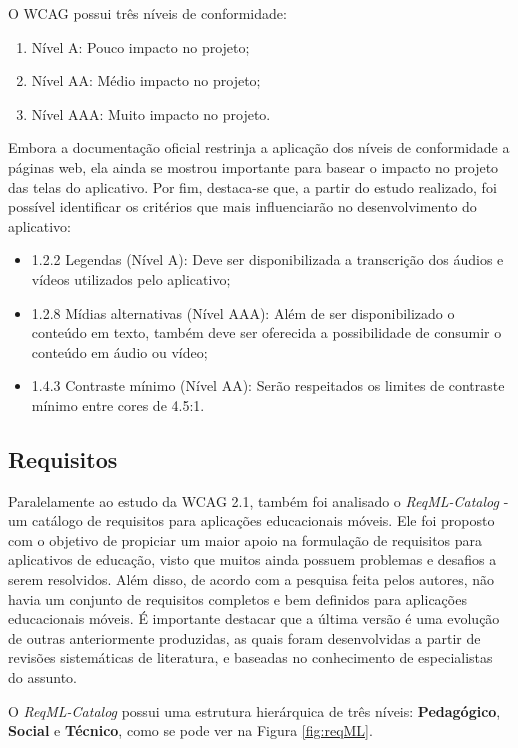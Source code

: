 O WCAG possui três níveis de conformidade:
\begin{enumerate}
    \item Nível A: Pouco impacto no projeto;
    \item Nível AA: Médio impacto no projeto;
    \item Nível AAA: Muito impacto no projeto.
\end{enumerate}

Embora a documentação oficial restrinja a aplicação dos níveis de conformidade a páginas web, ela ainda se mostrou importante para basear o impacto no projeto das telas do aplicativo. 
 Por fim, destaca-se que, a partir do estudo realizado, foi possível identificar os critérios que mais influenciarão no desenvolvimento do aplicativo:

\begin{itemize}
    \item 1.2.2 Legendas (Nível A): Deve ser disponibilizada a transcrição dos áudios e vídeos utilizados pelo aplicativo;
    \item 1.2.8 Mídias alternativas (Nível AAA): Além de ser disponibilizado o conteúdo em texto, também deve ser oferecida a possibilidade de consumir o conteúdo em áudio ou vídeo;
    \item 1.4.3 Contraste mínimo (Nível AA): Serão respeitados os limites de contraste mínimo entre cores de 4.5:1.
\end{itemize}


\subsection{Requisitos}
Paralelamente ao estudo da WCAG 2.1, também foi analisado o \textit{ReqML-Catalog}
\citep{soad2017reqml} - um catálogo de requisitos para aplicações educacionais móveis. Ele foi proposto com o objetivo de propiciar um maior apoio na formulação de requisitos para aplicativos de educação, visto que muitos ainda possuem problemas e desafios a serem resolvidos. Além disso, de acordo com a pesquisa feita pelos autores, não havia um conjunto de requisitos completos e bem definidos para aplicações educacionais móveis. É importante destacar que a última versão é uma evolução de outras anteriormente produzidas, as quais foram desenvolvidas a partir de revisões sistemáticas de literatura, e baseadas no conhecimento de especialistas do assunto. 

O \textit{ReqML-Catalog} possui uma estrutura hierárquica de três níveis: \textbf{Pedagógico}, \textbf{Social} e \textbf{Técnico}, como se pode ver na Figura \ref{fig:reqML}.

